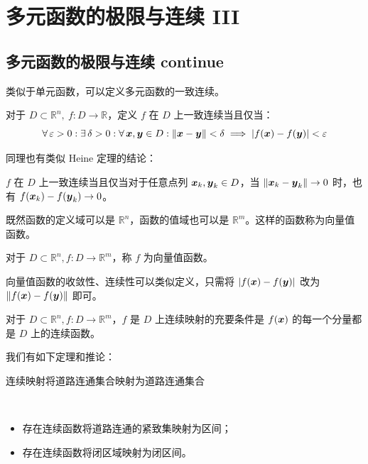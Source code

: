 \section{多元函数的极限与连续 III}

\subsection{多元函数的极限与连续 continue}

类似于单元函数，可以定义多元函数的一致连续。

\begin{definition}[一致连续]
    对于 $D \subset \mathbb{R}^{n},\ f: D \to \mathbb{R}$，定义 $f$ 在 $D$ 上一致连续当且仅当：
    $$
    \forall\,\varepsilon > 0: \exists\,\delta > 0: \forall\,\boldsymbol{x}, \boldsymbol{y} \in D: \norm{\boldsymbol{x} - \boldsymbol{y}} < \delta \implies \abs{f(\boldsymbol{x}) - f(\boldsymbol{y})} < \varepsilon
    $$
\end{definition}

同理也有类似 Heine 定理的结论：

\begin{theorem}
    $f$ 在 $D$ 上一致连续当且仅当对于任意点列 $\boldsymbol{x}_k, \boldsymbol{y}_k \in D$，当 $\norm{\boldsymbol{x}_k - \boldsymbol{y}_k} \to 0$ 时，也有 $f(\boldsymbol{x}_k) - f(\boldsymbol{y}_k) \to 0$。
\end{theorem}

既然函数的定义域可以是 $\mathbb{R}^{n}$，函数的值域也可以是 $\mathbb{R}^{m}$。这样的函数称为向量值函数。

\begin{definition}[向量值函数]
    对于 $D \subset \mathbb{R}^{n}, f: D \to \mathbb{R}^{m}$，称 $f$ 为向量值函数。
\end{definition}

向量值函数的收敛性、连续性可以类似定义，只需将 $\abs{f(\boldsymbol{x}) - f(\boldsymbol{y})}$ 改为 $\norm{f(\boldsymbol{x}) - f(\boldsymbol{y})}$ 即可。

\begin{theorem}
    对于 $D \subset \mathbb{R}^{n}, f: D \to \mathbb{R}^{m}$，$f$ 是 $D$ 上连续映射的充要条件是 $f(\boldsymbol{x})$ 的每一个分量都是 $D$ 上的连续函数。
\end{theorem}

我们有如下定理和推论：

\begin{theorem}
    连续映射将道路连通集合映射为道路连通集合
\end{theorem}

\begin{corollary}
    \ 
    \begin{itemize}
        \item 存在连续函数将道路连通的紧致集映射为区间；
        \item 存在连续函数将闭区域映射为闭区间。
    \end{itemize}
\end{corollary}

